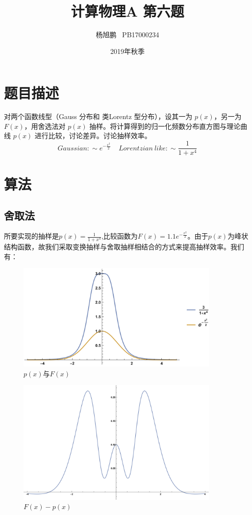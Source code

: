 \documentclass[a4paper,11pt]{article}
\author{ 杨旭鹏  \  PB17000234}
\date{2019年秋季}
\title{计算物理A 第六题}
\begin{document}
\maketitle

\section{题目描述}
对两个函数线型（Gauss 分布和 类Lorentz 型分布），设其一为 $p(x)$，另一为 $F(x)$，用舍选法对 $p(x)$ 抽样。将计算得到的归一化频数分布直方图与理论曲线 $p(x)$ 进行比较，讨论差异。讨论抽样效率。
\begin{equation}
	Gaussian:\sim e^{-\frac{x^{2}}{2}} ~~~~~Lorentzian ~ like:\sim \frac{1}{1+x^{4}}
\end{equation}



\section{算法}
\subsection{舍取法}
所要实现的抽样是$p(x) = \frac{1}{1+x^{4}}$,比较函数为$F(x)=1.1e^{-\frac{x^{2}}{2}}$。由于$p(x)$为峰状结构函数，故我们采取变换抽样与舍取抽样相结合的方式来提高抽样效率。我们有：

\begin{figure}[!htbp]        
\centering
\includegraphics[width=10cm]{1.png}      
\caption{ $p(x)$与$F(x)$}      
\end{figure}

\begin{figure}[!htbp]        
\centering
\includegraphics[width=10cm]{2.png}     
\caption{ $F(x)-p(x)$}      
\end{figure}
\end{document}
